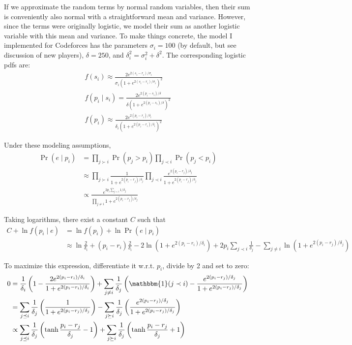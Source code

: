 \documentclass{article}
\begin{document}
If we approximate the random terms by normal random variables, then their sum is conveniently also normal with a straightforward mean and variance. However, since the terms were originally logistic, we model their sum as another logistic variable with this mean and variance. To make things concrete, the model I implemented for Codeforces has the parameters $\sigma_i = 100$ (by default, but see discussion of new players), $\delta = 250$, and $\delta_i^2 = \sigma_i^2 + \delta^2$. The corresponding logistic pdfs are:
\begin{align}
f(s_i) \approx \frac { 2e^{2(s_i-r_i)/\sigma_i} } { \sigma_i\left(1 + e^{2(s_i-r_i)/\sigma_i} \right)^2 }
\\f(p_i\mid s_i) = \frac { 2e^{2(p_i-s_i)/\delta} } { \delta\left(1 + e^{2(p_i-s_i)/\delta} \right)^2}
\\f(p_i) \approx \frac { 2e^{2(p_i-r_i)/\delta_i} } { \delta_i\left(1 + e^{2(p_i-r_i)/\delta_i} \right)^2}
\end{align}

Under these modeling assumptions,
\begin{align}
\Pr(e\mid p_i) &= \prod_{j \succ i} \Pr(p_j > p_i) \prod_{j \prec i} \Pr(p_j < p_i)
\\&\approx \prod_{j \succ i} \frac {1} {1 + e^{2(p_i-r_j)/\delta_j}} \prod_{j \prec i} \frac {e^{2(p_i-r_j)/\delta_j}} {1 + e^{2(p_i-r_j)/\delta_j}}
\\&\propto \frac {e^{2p_i\sum_{j\prec i}1/\delta_j}} {\prod_{j\neq i} 1 + e^{2(p_i-r_j)/\delta_j}}
\end{align}

Taking logarithms, there exist a constant $C$ such that
\begin{align}
C + \ln f(p_i\mid e) &= \ln f(p_i) + \ln \Pr(e\mid p_i)
\\&\approx \ln \frac{2}{\delta_i} + (p_i-r_i)\frac{2}{\delta_i} - 2\ln\left(1 + e^{2(p_i-r_i)/\delta_i} \right) + 2p_i\sum_{j\prec i} \frac{1}{\delta_j} - \sum_{j\neq i} \ln\left(1 + e^{2(p_i-r_j)/\delta_j}\right)
\end{align}

To maximize this expression, differentiate it w.r.t. $p_i$, divide by 2 and set to zero:
\begin{align}
0 &= \frac{1}{\delta_i}\left(1 - \frac {2e^{2(p_i-r_i)/\delta_i}} {1 + e^{2(p_i-r_i)/\delta_i}} \right) + \sum_{j\neq i}\frac{1}{\delta_j}\left(\mathbbm{1}(j\prec i) - \frac {e^{2(p_i-r_j)/\delta_j}} {1 + e^{2(p_i-r_j)/\delta_j}} \right)
\\&= \sum_{j\preceq i}\frac{1}{\delta_j}\left(\frac {1} {1 + e^{2(p_i-r_j)/\delta_j}} \right)
	- \sum_{j\succeq i}\frac{1}{\delta_j}\left(\frac {e^{2(p_i-r_j)/\delta_j}} {1 + e^{2(p_i-r_j)/\delta_j}} \right)
\\&\propto \sum_{j\preceq i}\frac{1}{\delta_j}\left( \tanh\frac {p_i - r_j} {\delta_j} - 1 \right) + \sum_{j\succeq i}\frac{1}{\delta_j}\left( \tanh\frac {p_i - r_j} {\delta_j} + 1 \right)
\end{align}
\end{document}
